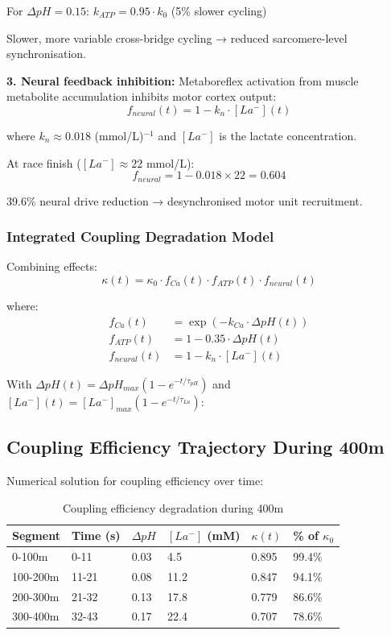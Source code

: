 For $\Delta pH = 0.15$: $k_{ATP} = 0.95 \cdot k_0$ (5\% slower cycling)

Slower, more variable cross-bridge cycling → reduced sarcomere-level synchronisation.

\textbf{3. Neural feedback inhibition:}
Metaboreflex activation from muscle metabolite accumulation inhibits motor cortex output:
\begin{equation}
f_{neural}(t) = 1 - k_n \cdot [La^-](t)
\end{equation}

where $k_n \approx 0.018$ (mmol/L)$^{-1}$ and $[La^-]$ is the lactate concentration.

At race finish ($[La^-] \approx 22$ mmol/L):
\begin{equation}
f_{neural} = 1 - 0.018 \times 22 = 0.604
\end{equation}

39.6\% neural drive reduction → desynchronised motor unit recruitment.

\subsubsection{Integrated Coupling Degradation Model}

Combining effects:
\begin{equation}
\kappa(t) = \kappa_0 \cdot f_{Ca}(t) \cdot f_{ATP}(t) \cdot f_{neural}(t)
\end{equation}

where:
\begin{align}
f_{Ca}(t) &= \exp(-k_{Ca} \cdot \Delta pH(t)) \\
f_{ATP}(t) &= 1 - 0.35 \cdot \Delta pH(t) \\
f_{neural}(t) &= 1 - k_n \cdot [La^-](t)
\end{align}

With $\Delta pH(t) = \Delta pH_{max}(1 - e^{-t/\tau_{pH}})$ and $[La^-](t) = [La^-]_{max}(1 - e^{-t/\tau_{La}})$:

\subsection{Coupling Efficiency Trajectory During 400m}

Numerical solution for coupling efficiency over time:

\begin{table}[H]
\centering
\caption{Coupling efficiency degradation during 400m}
\begin{tabular}{@{}llllll@{}}
\toprule
\textbf{Segment} & \textbf{Time (s)} & \textbf{$\Delta pH$} & \textbf{$[La^-]$ (mM)} & \textbf{$\kappa(t)$} & \textbf{\% of $\kappa_0$} \\
\midrule
0-100m & 0-11 & 0.03 & 4.5 & 0.895 & 99.4\% \\
100-200m & 11-21 & 0.08 & 11.2 & 0.847 & 94.1\% \\
200-300m & 21-32 & 0.13 & 17.8 & 0.779 & 86.6\% \\
300-400m & 32-43 & 0.17 & 22.4 & 0.707 & 78.6\% \\
\bottomrule
\end{tabular}
\end{table}


